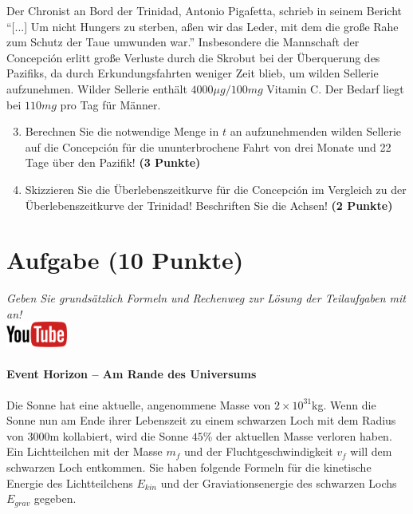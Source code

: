 \documentclass[a4paper, 9pt]{scrartcl}\usepackage[]{graphicx}\usepackage[]{xcolor}
\begin{document}
Der Chronist an Bord der Trinidad, Antonio Pigafetta, schrieb in seinem
Bericht "`[...] Um nicht Hungers zu sterben, a{\ss}en wir das Leder, mit dem
die gro{\ss}e Rahe zum Schutz der Taue umwunden war."' Insbesondere die
Mannschaft der Concepci{\'o}n erlitt gro{\ss}e Verluste durch die Skrobut bei der
{\"U}berquerung des Pazifiks, da durch Erkundungsfahrten weniger Zeit blieb, um
wilden Sellerie aufzunehmen. Wilder Sellerie enth{\"a}lt
$4000\mu g/100mg$ Vitamin C. Der Bedarf liegt bei
$110mg$ pro Tag f{\"u}r M{\"a}nner.

\begin{enumerate}
  \setcounter{enumi}{2}
\item Berechnen Sie die notwendige Menge in $t$ an
  aufzunehmenden wilden Sellerie auf die Concepci{\'o}n f{\"u}r die ununterbrochene
  Fahrt von drei Monate und 22 Tage {\"u}ber den Pazifik!
  \textbf{(3 Punkte)}
\item Skizzieren Sie die {\"U}berlebenszeitkurve f{\"u}r die Concepci{\'o}n im
  Vergleich zu der {\"U}berlebenszeitkurve der Trinidad! Beschriften Sie die
  Achsen! \textbf{(2 Punkte)}
\end{enumerate}

 
\clearpage

\section{Aufgabe \hfill (10 Punkte)}

\textit{Geben Sie grunds{\"a}tzlich Formeln und Rechenweg zur L{\"o}sung der
  Teilaufgaben mit an!} \\[1Ex]

\hfill\href{https://youtu.be/q-qYK4Chslg}{\includegraphics[width =
  2cm]{img/youtube}} %
\hspace{2Ex}

\paragraph{Event Horizon -- Am Rande des Universums}



Die Sonne hat eine aktuelle, angenommene Masse von $\ensuremath{2\times 10^{31}}$kg. Wenn
die Sonne nun am Ende ihrer Lebenszeit zu einem schwarzen Loch mit dem
Radius von $3000$m kollabiert, wird die Sonne $45$\%
der aktuellen Masse verloren haben. Ein Lichtteilchen mit der Masse $m_f$
und der Fluchtgeschwindigkeit $v_f$ will dem schwarzen Loch entkommen.  Sie
haben folgende Formeln f{\"u}r die kinetische Energie des Lichtteilchens
$E_{kin}$ und der Graviationsenergie des schwarzen Lochs $E_{grav}$
gegeben.
\end{document}
